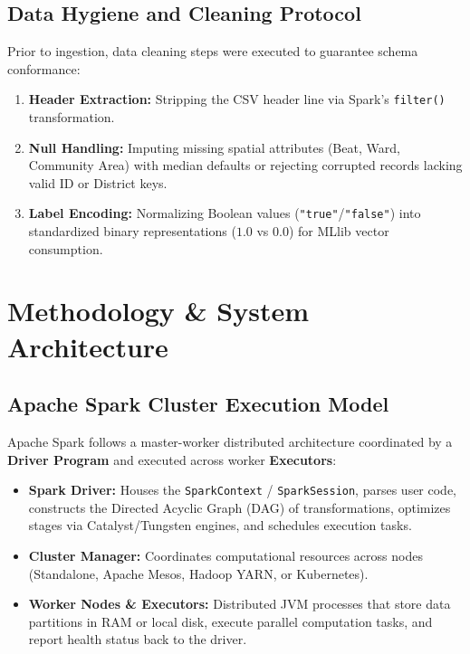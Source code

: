 \documentclass[11pt,a4paper]{article}
\begin{document}
\subsection{Data Hygiene and Cleaning Protocol}
Prior to ingestion, data cleaning steps were executed to guarantee schema conformance:
\begin{enumerate}
    \item \textbf{Header Extraction:} Stripping the CSV header line via Spark's \texttt{filter()} transformation.
    \item \textbf{Null Handling:} Imputing missing spatial attributes (Beat, Ward, Community Area) with median defaults or rejecting corrupted records lacking valid ID or District keys.
    \item \textbf{Label Encoding:} Normalizing Boolean values (\texttt{"true"}/\texttt{"false"}) into standardized binary representations ($1.0$ vs $0.0$) for MLlib vector consumption.
\end{enumerate}

\section{Methodology \& System Architecture}
\subsection{Apache Spark Cluster Execution Model}
Apache Spark follows a master-worker distributed architecture coordinated by a \textbf{Driver Program} and executed across worker \textbf{Executors}:
\begin{itemize}[leftmargin=*]
    \item \textbf{Spark Driver:} Houses the \texttt{SparkContext} / \texttt{SparkSession}, parses user code, constructs the Directed Acyclic Graph (DAG) of transformations, optimizes stages via Catalyst/Tungsten engines, and schedules execution tasks.
    \item \textbf{Cluster Manager:} Coordinates computational resources across nodes (Standalone, Apache Mesos, Hadoop YARN, or Kubernetes).
    \item \textbf{Worker Nodes \& Executors:} Distributed JVM processes that store data partitions in RAM or local disk, execute parallel computation tasks, and report health status back to the driver.
\end{itemize}
\end{document}
